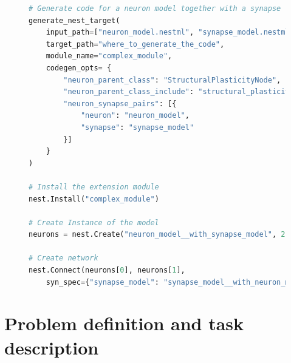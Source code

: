 \vspace{0.5em}
\begin{figure}[ht!]
\centering
\begin{lstlisting}[language=Python, label=lst:nestml_with_synapse, caption={The \texttt{generate\_nest\_target()} function generates code for the neuron and synapse together. The \texttt{input\_path} takes a list of NESTML files with the first being the neuron model, the second the synapse model. The library will be generated with the name \emph{complex\_module}. In contrast to the simple case in \autoref{lst:nestml_without_synapse}, co-generating the code for the neuron and synapse requires the user to provide the relation between the neuron and the synapse in the \texttt{codegen\_opts} dictionary. Installing the new library is not different from the previous case, we simply call the \texttt{Install()} function with \emph{complex\_module} as the library name. The main difference is in the creation of model instances. The neuron model is no longer registered in NEST under the name \emph{neuron\_model}, but the neuron name is now the concatenation of the neuron name and the synapse name to express the relation between the two. The same name mangling is applied for the synapse models, which becomes available under the name \emph{synapse\_model\_\_with\_neuron\_model}. These name changes have to be manually tracked by the user when calling \texttt{Create()} and \texttt{Connect()}.}, captionpos=b]
# Generate code for a neuron model together with a synapse
generate_nest_target(
    input_path=["neuron_model.nestml", "synapse_model.nestml"],
    target_path="where_to_generate_the_code",
    module_name="complex_module",
    codegen_opts= {
        "neuron_parent_class": "StructuralPlasticityNode",
        "neuron_parent_class_include": "structural_plasticity_node.h",
        "neuron_synapse_pairs": [{
            "neuron": "neuron_model",
            "synapse": "synapse_model"
        }]
    }
)

# Install the extension module
nest.Install("complex_module")

# Create Instance of the model
neurons = nest.Create("neuron_model__with_synapse_model", 2)

# Create network
nest.Connect(neurons[0], neurons[1],
    syn_spec={"synapse_model": "synapse_model__with_neuron_model"})
\end{lstlisting}
\end{figure}

\section{Problem definition and task description}

